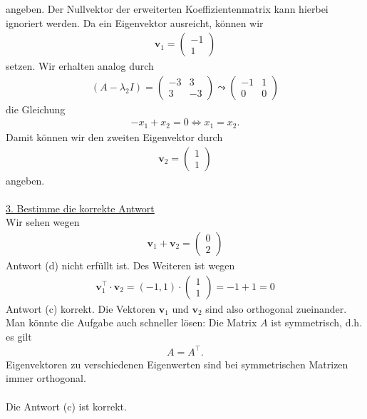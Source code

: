 angeben.
Der Nullvektor der erweiterten Koeffizientenmatrix kann hierbei ignoriert werden.
Da ein Eigenvektor ausreicht, können wir 
\begin{align*}
\textbf{v}_1 = 
\begin{pmatrix}
-1 \\
1
\end{pmatrix}
\end{align*}
setzen.
Wir erhalten analog durch
\begin{align*}
(A - \lambda_2 I) 
= 
\begin{pmatrix}
-3 & 3 \\
3 & -3
\end{pmatrix}
\leadsto
\begin{pmatrix}
-1 & 1 \\
0 & 0
\end{pmatrix}
\end{align*}
die Gleichung
\begin{align*}
-x_1 + x_2 = 0
\Leftrightarrow
x_1 = x_2.
\end{align*}
Damit können wir den zweiten Eigenvektor durch
\begin{align*}
\textbf{v}_2 = 
\begin{pmatrix}
1 \\
1
\end{pmatrix}
\end{align*}
angeben.\\
\\
\underline{3. Bestimme die korrekte Antwort}\\
Wir sehen wegen
\begin{align*}
\textbf{v}_1 + \textbf{v}_2
=
\begin{pmatrix}
0 \\
2
\end{pmatrix}
\end{align*}
Antwort (d) nicht erfüllt ist.
Des Weiteren ist wegen
\begin{align*}
\textbf{v}_1^\top \cdot \textbf{v}_2
=
( -1 , 1) \cdot 
\begin{pmatrix}
1\\
1
\end{pmatrix}
=
-1 + 1 = 0
\end{align*}
Antwort (c) korrekt.
Die Vektoren $\textbf{v}_1$ und $\textbf{v}_2$ sind also orthogonal zueinander.\\
Man könnte die Aufgabe auch schneller lösen: 
Die Matrix $A$ ist symmetrisch, d.h. es gilt
\begin{align*}
A = A^\top.
\end{align*}
Eigenvektoren zu verschiedenen Eigenwerten sind bei symmetrischen Matrizen immer orthogonal.\\
\\
Die Antwort (c) ist korrekt.
